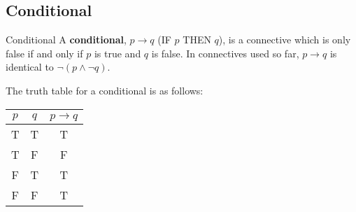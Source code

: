 \subsection{Conditional}


\begin{defn}{Conditional}
  A \textbf{conditional}, $ p \rightarrow q$ (IF $p$ THEN $q$), is a connective which is only false if and only if $p$ is true and $q$ is false.
  In connectives used so far, $p \rightarrow q$ is identical to $\neg (p \land \neg q)$.

  \begin{comment}
  \begin{itemize}
    \item[Modus Ponens] If $p$ is True, then the truth hinges on $q$.
    \item[Transitive] If $p \rightarrow q$ and $q \rightarrow r$, then $p \rightarrow r$ must also be true.
    \item[Contraposition] If $p \rightarrow q$ is True, then so must $\neg q \rightarrow p$.
    \item[Reductio]
  \end{itemize}
  \end{comment}

\end{defn}

The truth table for a conditional is as follows:

\begin{minipage}{\linewidth}
  \centering
  \begin{tabular}{c|c|c}
    $p$ & $q$ & $p \rightarrow q$ \\
    \hline
    T & T & T \\
    T & F & F \\
    F & T & T \\
    F & F & T \\
  \end{tabular}
   \label{tab:conditonal} 
\end{minipage}

